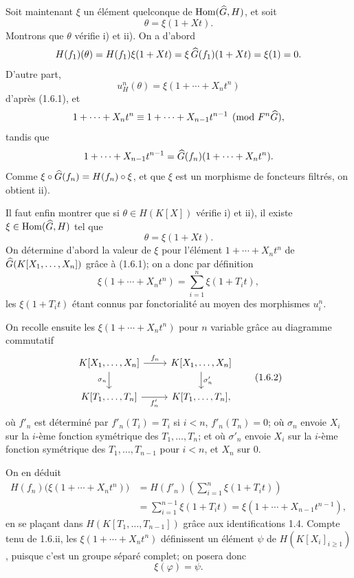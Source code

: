 \documentclass[11pt]{article}
\begin{document}
Soit maintenant \(\xi\) un élément quelconque de \(\operatorname{Hom}(\widehat G,H)\), et soit
\[
  \theta=\xi(1+Xt).
\]
Montrons que \(\theta\) vérifie i) et ii). On a d'abord
\[
  H(f_1)(\theta)=H(f_1)\xi(1+Xt)
  =\xi\,\widehat G(f_1)(1+Xt)=\xi(1)=0.
\]
D'autre part,
\[
  u_H^n(\theta)=\xi(1+\cdots+X_nt^n)
\]
d'après (1.6.1), et
\[
  1+\cdots+X_nt^n\equiv 1+\cdots+X_{n-1}t^{n-1}
  \pmod{F^n\widehat G},
\]
tandis que
\[
  1+\cdots+X_{n-1}t^{n-1}=\widehat G(f_n)(1+\cdots+X_nt^n).
\]
Comme \(\xi\circ\widehat G(f_n)=H(f_n)\circ\xi\), et que \(\xi\) est un morphisme de foncteurs filtrés, on obtient ii).

Il faut enfin montrer que si \(\theta\in H(K[X])\) vérifie i) et ii), il existe \(\xi\in\operatorname{Hom}(\widehat G,H)\) tel que
\[
  \theta=\xi(1+Xt).
\]
On détermine d'abord la valeur de \(\xi\) pour l'élément \(1+\cdots+X_nt^n\) de \(\widehat G(K[X_1,\ldots,X_n])\) grâce à (1.6.1); on a donc par définition
\[
  \xi(1+\cdots+X_nt^n)
  =
  \sum_{i=1}^n \xi(1+T_it),
\]
les \(\xi(1+T_it)\) étant connus par fonctorialité au moyen des morphismes \(u_i^n\).

On recolle ensuite les \(\xi(1+\cdots+X_nt^n)\) pour \(n\) variable grâce au diagramme commutatif
\[
\begin{tikzcd}
K[X_1,\ldots,X_n] \arrow[r,"f_n"] \arrow[d,"\sigma_n"'] &
K[X_1,\ldots,X_n] \arrow[d,"\sigma'_n"]\\
K[T_1,\ldots,T_n] \arrow[r,"f'_n"'] &
K[T_1,\ldots,T_n],
\end{tikzcd}
\tag{1.6.2}
\]
où \(f'_n\) est déterminé par \(f'_n(T_i)=T_i\) si \(i<n\), \(f'_n(T_n)=0\); où \(\sigma_n\) envoie \(X_i\) sur la \(i\)-ème fonction symétrique des \(T_1,\ldots,T_n\); et où \(\sigma'_n\) envoie \(X_i\) sur la \(i\)-ème fonction symétrique des \(T_1,\ldots,T_{n-1}\) pour \(i<n\), et \(X_n\) sur \(0\).

On en déduit
\[
\begin{aligned}
H(f_n)\bigl(\xi(1+\cdots+X_nt^n)\bigr)
&=H(f'_n)\left(\sum_{i=1}^n \xi(1+T_it)\right)\\
&=\sum_{i=1}^{n-1}\xi(1+T_it)
=\xi(1+\cdots+X_{n-1}t^{n-1}),
\end{aligned}
\]
en se plaçant dans \(H(K[T_1,\ldots,T_{n-1}])\) grâce aux identifications 1.4. Compte tenu de 1.6.ii, les \(\xi(1+\cdots+X_nt^n)\) définissent un élément \(\psi\) de \(H(K[X_i]_{i\geq1})\), puisque c'est un groupe séparé complet; on posera donc
\[
  \xi(\varphi)=\psi .
\]
\end{document}
